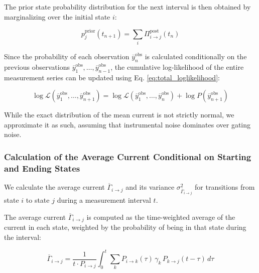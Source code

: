 \documentclass[pdflatex,sn-mathphys-num]{sn-jnl}%
\theoremstyle{thmstyleone}%
\theoremstyle{thmstyletwo}%
\theoremstyle{thmstylethree}%
\begin{document}
The prior state probability distribution for the next interval is then obtained by marginalizing over the initial state \( i \):

\begin{equation}
	p_j^{\text{prior}}(t_{n+1}) = \sum_i \Pi_{i \rightarrow j}^{\text{post}}(t_n)
	\label{eq:single_channel_integrated_next_prior}
\end{equation}

Since the probability of each observation \( \overline{y}_n^{\text{obs}} \) is calculated conditionally on the previous observations \( \overline{y}_1^{\text{obs}}, \dots, \overline{y}_{n-1}^{\text{obs}} \), the cumulative log-likelihood of the entire measurement series can be updated using Eq. \ref{eq:total_loglikelihood}:

\begin{equation}
	\log \mathcal{L}(\overline{y}_1^{\text{obs}}, \dots, \overline{y}_{n+1}^{\text{obs}}) = \log \mathcal{L}(\overline{y}_1^{\text{obs}}, \dots, \overline{y}_n^{\text{obs}}) + \log P(\overline{y}_{n+1}^{\text{obs}})
	\label{eq:single_channel_integrated_total_likelihood}
\end{equation}

While the exact distribution of the mean current is not strictly normal, we approximate it as such, assuming that instrumental noise dominates over gating noise.

\subsubsection{Calculation of the Average Current Conditional on Starting and Ending States}

We calculate the average current \( \overline{\Gamma}_{i \rightarrow j} \) and its variance \( \sigma^2_{\overline{\Gamma}_{i \rightarrow j}} \) for transitions from state \( i \) to state \( j \) during a measurement interval \( t \).

The average current \( \overline{\Gamma}_{i \rightarrow j} \) is computed as the time-weighted average of the current in each state, weighted by the probability of being in that state during the interval:

\begin{equation}
	\overline{\Gamma}_{i \rightarrow j} = \frac{1}{t \cdot P_{i \rightarrow j}} \int_0^t \sum_k P_{i \rightarrow k}(\tau) \, \gamma_k \, P_{k \rightarrow j}(t - \tau) \, d\tau
	\label{eq:gamma_ij_integral}
\end{equation}
\end{document}
